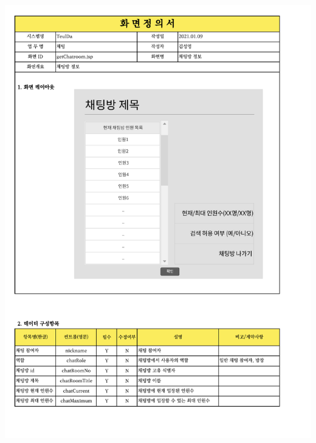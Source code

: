 {{{{{{{{{{{{{{{{{{{{{{{{{{{{{{{{{{{{{{{{{{{{{{{{{{{{{{{{{{{{{{{{{{{\includegraphics[width=20cm]{./Figure/Analysis/Display/chat/chat_06.pdf} \\
}}}}}}}}}}}}}}}}}}}}}}}}}}}}}}}}}}}}}}}}}}}}}}}}}}}}}}}}}}}}}}}}}}}
